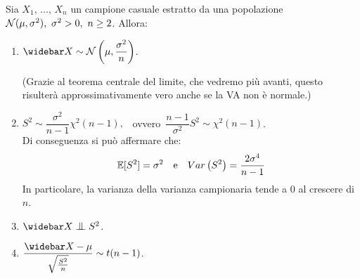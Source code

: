 \medskip
\begin{teo}
  Sia $X_1, \, \dots, \,  X_n$ un campione casuale estratto da una popolazione $\mathcal N(\mu, \sigma^2), \ \sigma^2>0, \ n \ge 2$. Allora:
  \begin{enumerate}
    \item $\widebar X \sim \Nc\left(\mu, \dfrac{\sigma^2}{n}\right)$.

    (Grazie al teorema centrale del limite, che vedremo più avanti, questo risulterà approssimativamente vero anche se la VA non è normale.)
    \item $S^2 \sim \dfrac{\sigma^2}{n-1} \chi^2(n-1), \enspace$ ovvero $\, \dfrac{n-1}{\sigma^2}S^2 \sim \chi^2(n-1)$.\\
    Di conseguenza si può affermare che:
    $$\mathbb E[S^2]=\sigma^2 \quad \text{e} \quad Var\left(S^2\right)=\dfrac{2\sigma^4}{n-1}$$
    In particolare, la varianza della varianza campionaria tende a 0 al crescere di $n$.
    \item $\widebar X \indep S^2$.
    \item $\dfrac{\widebar X-\mu}{\sqrt{\frac{S^2}{n}}} \sim t(n-1)$.
  \end{enumerate}
\end{teo}
